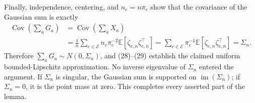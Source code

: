 Finally, independence, centering, and \(n_e=n\pi_e\) show that the covariance of the Gaussian sum is exactly
\[
 \begin{aligned}
 \operatorname{Cov}\!\left(\sum_aG_a\right)
 &=\operatorname{Cov}\!\left(\sum_aX_a\right)\\
 &=\frac1n\sum_{e\in\mathcal E}n_e\pi_e^{-2}
   \mathbb E[\zeta_{e,n}\zeta_{e,n}^\top]
 =\sum_{e\in\mathcal E}\pi_e^{-1}
   \mathbb E[\zeta_{e,n}\zeta_{e,n}^\top]
 =\Sigma_n. \tag{29}
\end{aligned}
\]
Therefore \(\sum_aG_a\sim N(0,\Sigma_n)\), and (28)--(29) establish the claimed uniform bounded-Lipschitz approximation.  No inverse eigenvalue of \(\Sigma_n\) entered the argument.  If \(\Sigma_n\) is singular, the Gaussian sum is supported on \(\operatorname{im}(\Sigma_n)\); if \(\Sigma_n=0\), it is the point mass at zero.  This completes every asserted part of the lemma.
